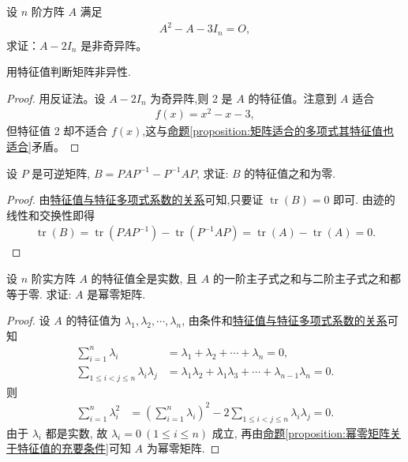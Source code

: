 \documentclass[../../main.tex]{subfiles}%
\begin{document}
\begin{example}
设 \(n\) 阶方阵 \(A\) 满足 
\begin{align*}
A^2 - A - 3I_n = O,
\end{align*}
求证：\(A - 2I_n\) 是非奇异阵。
\end{example}
\begin{note}
用特征值判断矩阵非异性.
\end{note}
\begin{proof}
用反证法。设 \(A - 2I_n\) 为奇异阵,则 2 是 \(A\) 的特征值。注意到 \(A\) 适合 
\begin{align*}
f(x) = x^2 - x - 3,
\end{align*}
但特征值 2 却不适合 \(f(x)\),这与\hyperref[proposition:矩阵适合的多项式其特征值也适合]{命题\ref{proposition:矩阵适合的多项式其特征值也适合}}矛盾。
\end{proof}

\begin{example}
设 $P$ 是可逆矩阵, $B = PAP^{-1} - P^{-1}AP$, 求证: $B$ 的特征值之和为零.
\end{example}
\begin{proof}
由\hyperref[proposition:特征值与特征多项式系数的关系]{特征值与特征多项式系数的关系}可知,只要证 $\operatorname{tr}(B) = 0$ 即可. 由迹的线性和交换性即得
\begin{align*}
\operatorname{tr}(B) = \operatorname{tr}(PAP^{-1}) - \operatorname{tr}(P^{-1}AP) 
= \operatorname{tr}(A) - \operatorname{tr}(A) = 0.
\end{align*}
\end{proof}

\begin{example}
设 $n$ 阶实方阵 $A$ 的特征值全是实数, 且 $A$ 的一阶主子式之和与二阶主子式之和都等于零. 求证: $A$ 是幂零矩阵.
\end{example}
\begin{proof}
设 $A$ 的特征值为 $\lambda_1, \lambda_2, \cdots, \lambda_n$, 由条件和\hyperref[proposition:特征值与特征多项式系数的关系]{特征值与特征多项式系数的关系}可知
\begin{align*}
\sum_{i=1}^n \lambda_i &= \lambda_1 + \lambda_2 + \cdots + \lambda_n = 0, \\
\sum_{1 \leqslant  i < j \leqslant  n} \lambda_i \lambda_j &= \lambda_1 \lambda_2 + \lambda_1 \lambda_3 + \cdots + \lambda_{n-1} \lambda_n = 0.
\end{align*}
则
\begin{align*}
\sum_{i=1}^n \lambda_i^2 &= \left( \sum_{i=1}^n \lambda_i \right)^2 - 2 \sum_{1 \leqslant  i < j \leqslant  n} \lambda_i \lambda_j = 0.
\end{align*}
由于 $\lambda_i$ 都是实数, 故 $\lambda_i = 0 \ (1 \leqslant  i \leqslant  n)$ 成立, 再由\hyperref[proposition:幂零矩阵关于特征值的充要条件]{命题\ref{proposition:幂零矩阵关于特征值的充要条件}}可知 $A$ 为幂零矩阵.
\end{proof}
\end{document}
